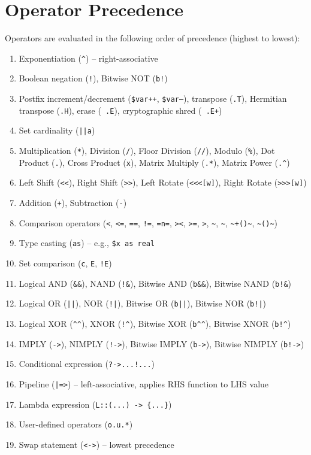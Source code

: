 \section{Operator Precedence}
Operators are evaluated in the following order of precedence (highest to lowest):
\begin{enumerate}
\item Exponentiation (\texttt{\^{}}) -- right-associative
\item Boolean negation (\texttt{!}), Bitwise NOT (\texttt{b!})
\item Postfix increment/decrement (\texttt{\$var++}, \texttt{\$var--}), transpose (\texttt{.T}), Hermitian transpose (\texttt{.H}), erase (\texttt{~.E}), cryptographic shred (\texttt{~.E+})
\item Set cardinality (\texttt{||a})
\item Multiplication (\texttt{*}), Division (\texttt{/}), Floor Division (\texttt{//}), Modulo (\texttt{\%}), Dot Product (\texttt{.}), Cross Product (\texttt{x}), Matrix Multiply (\texttt{.*}), Matrix Power (\texttt{.\^{}})
\item Left Shift (\texttt{<<}), Right Shift (\texttt{>>}), Left Rotate (\texttt{<<<[w]}), Right Rotate (\texttt{>>>[w]})
\item Addition (\texttt{+}), Subtraction (\texttt{-})
\item Comparison operators (\texttt{<}, \texttt{<=}, \texttt{==}, \texttt{!=}, \texttt{=n=}, \texttt{><}, \texttt{>=}, \texttt{>}, \texttt{\textasciitilde}, \texttt{\textasciitilde*}, \texttt{\textasciitilde+()\textasciitilde}, \texttt{\textasciitilde*()\textasciitilde})
\item Type casting (\texttt{as}) -- e.g., \texttt{\$x as real}
\item Set comparison (\texttt{c}, \texttt{E}, \texttt{!E})
\item Logical AND (\texttt{\&\&}), NAND (\texttt{!\&}), Bitwise AND (\texttt{b\&\&}), Bitwise NAND (\texttt{b!\&})
\item Logical OR (\texttt{||}), NOR (\texttt{!|}), Bitwise OR (\texttt{b||}), Bitwise NOR (\texttt{b!|})
\item Logical XOR (\texttt{\^{}}\texttt{\^{}}), XNOR (\texttt{!}\texttt{\^{}}), Bitwise XOR (\texttt{b\^{}}\texttt{\^{}}), Bitwise XNOR (\texttt{b!}\texttt{\^{}})
\item IMPLY (\texttt{->}), NIMPLY (\texttt{!->}), Bitwise IMPLY (\texttt{b->}), Bitwise NIMPLY (\texttt{b!->})
\item Conditional expression (\texttt{?->...!...})
\item Pipeline (\texttt{|=>}) -- left-associative, applies RHS function to LHS value
\item Lambda expression (\texttt{L::(...) -> \{...\}})
\item User-defined operators (\texttt{o.u.*})
\item Swap statement (\texttt{<->}) -- lowest precedence
\end{enumerate}


